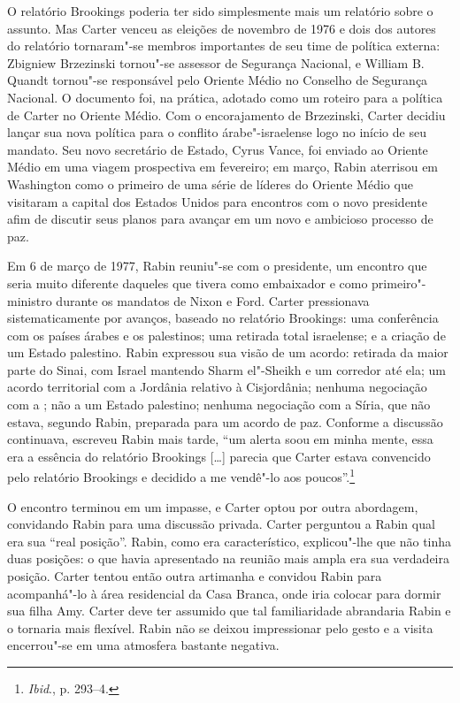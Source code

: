 O relatório Brookings poderia ter sido simplesmente mais um relatório
sobre o assunto. Mas Carter venceu as eleições de novembro de 1976 e
dois dos autores do relatório tornaram"-se membros importantes de seu
time de política externa: Zbigniew Brzezinski tornou"-se assessor de
Segurança Nacional, e William B. Quandt tornou"-se responsável pelo Oriente
Médio no Conselho de Segurança Nacional. O documento foi, na prática,
adotado como um roteiro para a política de Carter no Oriente Médio. Com
o encorajamento de Brzezinski, Carter decidiu lançar sua nova política
para o conflito árabe"-israelense logo no início de seu mandato. Seu novo
secretário de Estado, Cyrus Vance, foi enviado ao Oriente Médio em uma
viagem prospectiva em fevereiro; em março, Rabin aterrisou em Washington
como o primeiro de uma série de líderes do Oriente Médio que visitaram
a capital dos Estados Unidos para encontros com o novo presidente afim de discutir
seus planos para avançar em um novo e ambicioso processo de paz.

Em 6 de março de 1977, Rabin reuniu"-se com o presidente, um encontro
que seria muito diferente daqueles que tivera como embaixador e como
primeiro"-ministro durante os mandatos de Nixon e Ford. Carter
pressionava sistematicamente por avanços, baseado no relatório
Brookings: uma conferência com os países árabes e os palestinos; uma
retirada total israelense; e a criação de um Estado palestino. Rabin
expressou sua visão de um acordo: retirada da maior parte do Sinai, com
Israel mantendo Sharm el"-Sheikh e um corredor até ela; um acordo
territorial com a Jordânia relativo à Cisjordânia; nenhuma negociação
com a ; não a um Estado palestino; nenhuma negociação com a Síria, que
não estava, segundo Rabin, preparada para um acordo de paz. Conforme a
discussão continuava, escreveu Rabin mais tarde, ``um alerta soou em
minha mente, essa era a essência do relatório Brookings {[}\ldots{}{]} parecia que
Carter estava convencido pelo relatório Brookings e decidido a me
vendê"-lo aos poucos''.\footnote{\emph{Ibid}., p. 293--4.}

O encontro terminou em um impasse, e Carter optou por outra abordagem,
convidando Rabin para uma discussão privada. Carter perguntou a Rabin
qual era sua ``real posição''. Rabin, como era característico,
explicou"-lhe que não tinha duas posições: o que havia apresentado na
reunião mais ampla era sua verdadeira posição. Carter tentou então outra
artimanha e convidou Rabin para acompanhá"-lo à área residencial da Casa
Branca, onde iria colocar para dormir sua filha Amy. Carter deve ter
assumido que tal familiaridade abrandaria Rabin e o tornaria mais
flexível. Rabin não se deixou impressionar pelo gesto e a visita
encerrou"-se em uma atmosfera bastante negativa.

